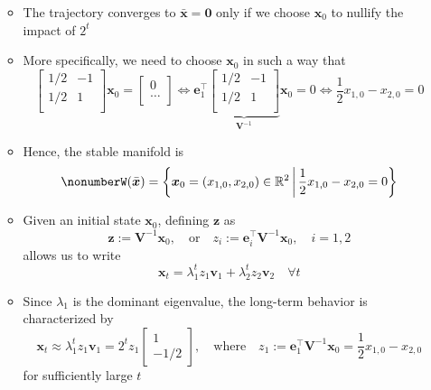 \documentclass[12pt,a4paper]{article}
\begin{document}
\begin{itemize}
\begin{itemize}
\begin{equation}
      \end{equation}
    \item
      The trajectory converges to $\bar{\bm{x}}=\bm{0}$
      only if we choose $\bm{x}_{0}$
      to nullify the impact of $2^{t}$
    \item More specifically, we need to choose $\bm{x}_{0}$
      in such a way that
      \begin{equation}\nonumber%
      \begin{bmatrix}
        1/2 & -1 \\
        1/2 & 1 \\
      \end{bmatrix}
      \bm{x}_{0}
      = 
      \begin{bmatrix}
        0 \\
        \ldots \\
      \end{bmatrix}
      \iff
      \bm{e}_{1}^{\top}
      \underbrace{\begin{bmatrix}
        1/2 & -1 \\
        1/2 & 1 \\
      \end{bmatrix}}_{\bm{V}^{-1}}
      \bm{x}_{0} = 0
      \iff
      \frac{1}{2}x_{1,0} - x_{2,0} = 0
      \end{equation}
    \item Hence, the stable manifold is
      \begin{equation}\nonumber%
        W(\bar{\bm{x}}) = \left\{\bm{x}_{0}=(x_{1,0},x_{2,0})\in \R^{2}\,\bigg|\, \frac{1}{2}x_{1,0} - x_{2,0} = 0\right\}
      \end{equation}
    \item Given an initial state $\bm{x}_{0}$,
      defining $\bm{z}$ as
      \begin{equation}\nonumber%
        \bm{z} := \bm{V}^{-1}\bm{x}_{0},
        \quad\text{or}\quad
        z_{i} := \bm{e}_{i}^{\top}\bm{V}^{-1}\bm{x}_{0},
        \quad i = 1, 2
      \end{equation}
      allows us to write
    \begin{equation}\nonumber%
      \bm{x}_{t}
      =
      \lambda_{1}^{t}z_{1}\bm{v}_{1}
      +
      \lambda_{2}^{t}z_{2}\bm{v}_{2}
      \quad \forall t
    \end{equation}
    \item Since $\lambda_{1}$ is the dominant eigenvalue,
      the long-term behavior is characterized by
    \begin{equation}\nonumber%
      \bm{x}_{t}
      \approx
      \lambda_{1}^{t}z_{1}\bm{v}_{1}
      =
      2^{t}z_{1}
      \begin{bmatrix}
        1 \\ -1/2
      \end{bmatrix},
      \quad\text{where}\quad
      z_{1}:=\bm{e}_{1}^{\top}\bm{V}^{-1}\bm{x}_{0}
      = \frac{1}{2}x_{1,0} - x_{2,0}
    \end{equation}
    for sufficiently large $t$
  \end{itemize}


\end{itemize}
\end{document}
